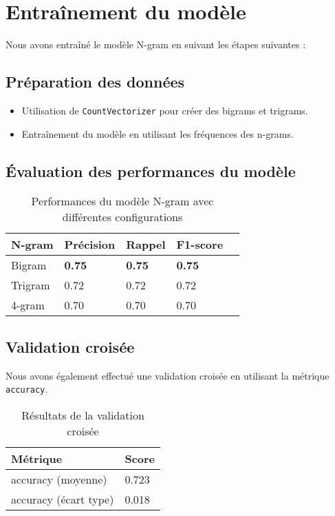 \section{Entraînement du modèle}

Nous avons entraîné le modèle N-gram en suivant les étapes suivantes :

\subsection{Préparation des données}

\begin{itemize}
    \item Utilisation de \texttt{CountVectorizer} pour créer des bigrams et trigrams.
    \item Entraînement du modèle en utilisant les fréquences des n-grams.
\end{itemize}

\subsection{Évaluation des performances du modèle}

\begin{table}[h]
    \centering
    \begin{tabular}{|l|l|l|l|l|}
    \hline
    \textbf{N-gram} & \textbf{Précision} & \textbf{Rappel} & \textbf{F1-score} \\ \hline
    Bigram & \textbf{0.75} & \textbf{0.75} & \textbf{0.75} \\ \hline
    Trigram & 0.72 & 0.72 & 0.72 \\ \hline
    4-gram & 0.70 & 0.70 & 0.70 \\ \hline
    \end{tabular}
    \caption{Performances du modèle N-gram avec différentes configurations}
\end{table}

\subsection{Validation croisée}

Nous avons également effectué une validation croisée en utilisant la métrique \texttt{accuracy}.

\begin{table}[h]
    \centering
    \begin{tabular}{|l|l|}
    \hline
    \textbf{Métrique} & \textbf{Score} \\ \hline
    accuracy (moyenne) & 0.723 \\ \hline
    accuracy (écart type) & 0.018 \\ \hline
    \end{tabular}
    \caption{Résultats de la validation croisée}
\end{table}

